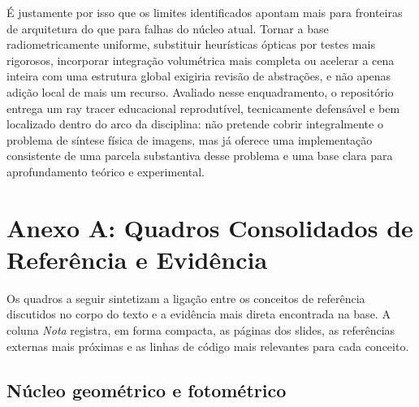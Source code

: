 \documentclass[portuguese]{sbcreviews-2025}%
\begin{document}
É justamente por isso que os limites identificados apontam mais para fronteiras de arquitetura do que para falhas do núcleo atual. Tornar a base radiometricamente uniforme, substituir heurísticas ópticas por testes mais rigorosos, incorporar integração volumétrica mais completa ou acelerar a cena inteira com uma estrutura global exigiria revisão de abstrações, e não apenas adição local de mais um recurso. Avaliado nesse enquadramento, o repositório entrega um ray tracer educacional reprodutível, tecnicamente defensável e bem localizado dentro do arco da disciplina: não pretende cobrir integralmente o problema de síntese física de imagens, mas já oferece uma implementação consistente de uma parcela substantiva desse problema e uma base clara para aprofundamento teórico e experimental.




\clearpage
\section*{Anexo A: Quadros Consolidados de Referência e Evidência}

Os quadros a seguir sintetizam a ligação entre os conceitos de referência discutidos no corpo do texto e a evidência mais direta encontrada na base. A coluna \emph{Nota} registra, em forma compacta, as páginas dos slides, as referências externas mais próximas e as linhas de código mais relevantes para cada conceito.

\subsection*{Núcleo geométrico e fotométrico}
\end{document}
